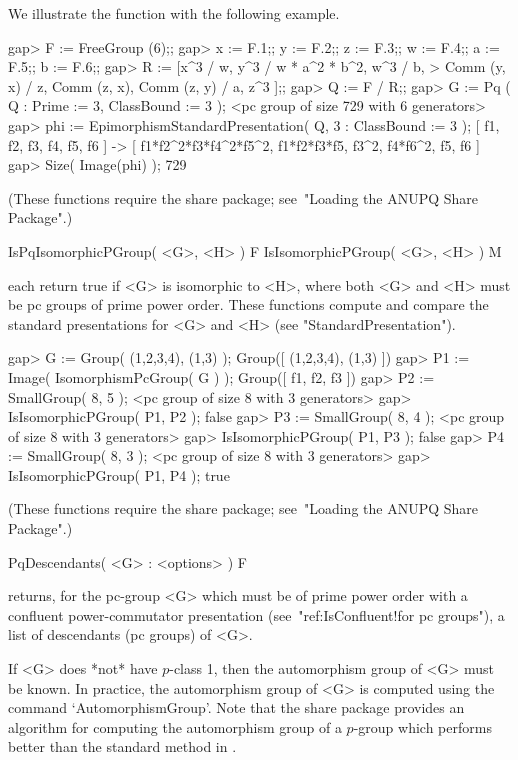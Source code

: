 We illustrate the function with the following example.

\beginexample
gap> F := FreeGroup (6);;
gap> x := F.1;; y := F.2;; z := F.3;; w := F.4;; a := F.5;; b := F.6;;
gap> R := [x^3 / w, y^3 / w * a^2 * b^2, w^3 / b,
>          Comm (y, x) / z, Comm (z, x), Comm (z, y) / a, z^3 ];;
gap> Q := F / R;;
gap> G := Pq ( Q : Prime := 3, ClassBound := 3 );
<pc group of size 729 with 6 generators>
gap> phi := EpimorphismStandardPresentation( Q, 3 : ClassBound := 3 );
[ f1, f2, f3, f4, f5, f6 ] -> [ f1*f2^2*f3*f4^2*f5^2, f1*f2*f3*f5, f3^2, 
  f4*f6^2, f5, f6 ]
gap> Size( Image(phi) );
729
\endexample

(These functions require the {\ANUPQ}  share  package;  see~"Loading  the
ANUPQ Share Package".)


\>IsPqIsomorphicPGroup( <G>, <H> ) F
\>IsIsomorphicPGroup( <G>, <H> ) M

each return true if <G> is isomorphic to <H>, where both <G> and <H> must
be pc groups of prime power order. These functions  compute  and  compare
the standard presentations for <G> and <H> (see "StandardPresentation").


\beginexample
gap> G := Group( (1,2,3,4), (1,3) );
Group([ (1,2,3,4), (1,3) ])
gap> P1 := Image( IsomorphismPcGroup( G ) );
Group([ f1, f2, f3 ])
gap> P2 := SmallGroup( 8, 5 );
<pc group of size 8 with 3 generators>
gap> IsIsomorphicPGroup( P1, P2 );
false
gap> P3 := SmallGroup( 8, 4 );
<pc group of size 8 with 3 generators>
gap> IsIsomorphicPGroup( P1, P3 );
false
gap> P4 := SmallGroup( 8, 3 );
<pc group of size 8 with 3 generators>
gap> IsIsomorphicPGroup( P1, P4 );
true
\endexample

(These functions require the {\ANUPQ}  share  package;  see~"Loading  the
ANUPQ Share Package".)


\>PqDescendants( <G> : <options> ) F

returns, for the pc-group <G> which must be of prime power order  with  a
confluent  power-commutator  presentation  (see~"ref:IsConfluent!for   pc
groups"), a list of descendants (pc groups) of <G>.

If <G> does *not* have $p$-class 1, then the automorphism  group  of  <G>
must be known. In practice, the automorphism group  of  <G>  is  computed
using the {\GAP} command `AutomorphismGroup'. Note that the {\GAP}  share
package {\AutPGrp} provides an algorithm for computing  the  automorphism
group of a $p$-group which performs better than the  standard  method  in
{\GAP}.


